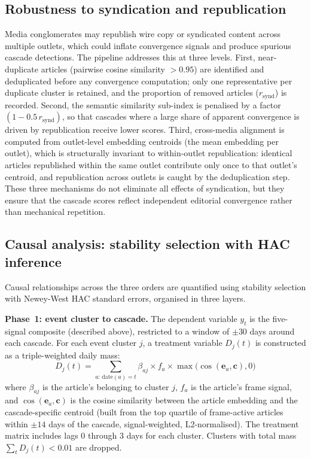 \subsection*{Robustness to syndication and republication}\label{sec:syndication}

Media conglomerates may republish wire copy or syndicated content across multiple outlets, which could inflate convergence signals and produce spurious cascade detections. The pipeline addresses this at three levels. First, near-duplicate articles (pairwise cosine similarity $> 0.95$) are identified and deduplicated before any convergence computation; only one representative per duplicate cluster is retained, and the proportion of removed articles ($r_{\text{synd}}$) is recorded. Second, the semantic similarity sub-index is penalised by a factor $(1 - 0.5\, r_{\text{synd}})$, so that cascades where a large share of apparent convergence is driven by republication receive lower scores. Third, cross-media alignment is computed from outlet-level embedding centroids (the mean embedding per outlet), which is structurally invariant to within-outlet republication: identical articles republished within the same outlet contribute only once to that outlet's centroid, and republication across outlets is caught by the deduplication step. These three mechanisms do not eliminate all effects of syndication, but they ensure that the cascade scores reflect independent editorial convergence rather than mechanical repetition.

\subsection*{Causal analysis: stability selection with HAC inference}

Causal relationships across the three orders are quantified using stability selection\cite{meinshausenStabilitySelection2010} with Newey-West HAC standard errors, organised in three layers.

\textbf{Phase~1: event cluster to cascade.} The dependent variable $y_t$ is the five-signal composite (described above), restricted to a window of $\pm 30$ days around each cascade. For each event cluster $j$, a treatment variable $D_j(t)$ is constructed as a triple-weighted daily mass:
\begin{equation}
D_j(t) = \sum_{a:\, \text{date}(a)=t} \beta_{aj} \times f_a \times \max\bigl(\cos(\mathbf{e}_a, \mathbf{c}), 0\bigr)
\end{equation}
where $\beta_{aj}$ is the article's belonging to cluster $j$, $f_a$ is the article's frame signal, and $\cos(\mathbf{e}_a, \mathbf{c})$ is the cosine similarity between the article embedding and the cascade-specific centroid (built from the top quartile of frame-active articles within $\pm 14$ days of the cascade, signal-weighted, L2-normalised). The treatment matrix includes lags 0 through 3 days for each cluster. Clusters with total mass $\sum_t D_j(t) < 0.01$ are dropped.

